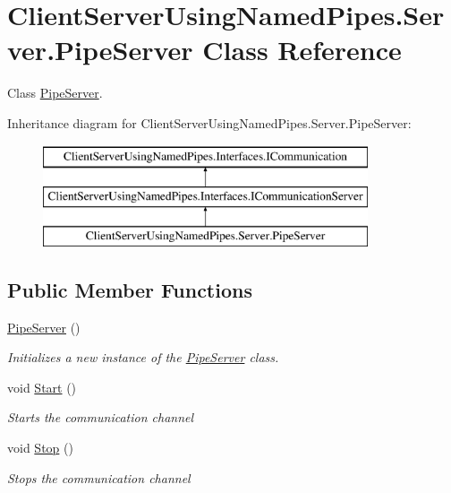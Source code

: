 \hypertarget{class_client_server_using_named_pipes_1_1_server_1_1_pipe_server}{}\section{Client\+Server\+Using\+Named\+Pipes.\+Server.\+Pipe\+Server Class Reference}
\label{class_client_server_using_named_pipes_1_1_server_1_1_pipe_server}


Class \hyperlink{class_client_server_using_named_pipes_1_1_server_1_1_pipe_server}{Pipe\+Server}.  


Inheritance diagram for Client\+Server\+Using\+Named\+Pipes.\+Server.\+Pipe\+Server\+:\begin{figure}[H]
\begin{center}
\leavevmode
\includegraphics[height=3.000000cm]{class_client_server_using_named_pipes_1_1_server_1_1_pipe_server}
\end{center}
\end{figure}
\subsection*{Public Member Functions}
\begin{DoxyCompactItemize}
\item 
\hyperlink{class_client_server_using_named_pipes_1_1_server_1_1_pipe_server_aade95dd64f11dd0e777557cedf31ca2e}{Pipe\+Server} ()
\begin{DoxyCompactList}\small\item\em Initializes a new instance of the \hyperlink{class_client_server_using_named_pipes_1_1_server_1_1_pipe_server}{Pipe\+Server} class. \end{DoxyCompactList}\item 
void \hyperlink{class_client_server_using_named_pipes_1_1_server_1_1_pipe_server_a91d854612c235fa7da870e6a861f91c5}{Start} ()
\begin{DoxyCompactList}\small\item\em Starts the communication channel \end{DoxyCompactList}\item 
void \hyperlink{class_client_server_using_named_pipes_1_1_server_1_1_pipe_server_a37eb41a1b69ab108b9eb5745950b3ab9}{Stop} ()
\begin{DoxyCompactList}\small\item\em Stops the communication channel \end{DoxyCompactList}\end{DoxyCompactItemize}
